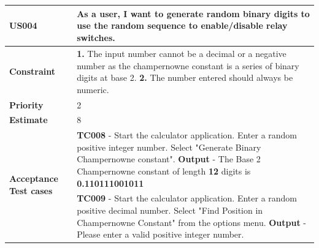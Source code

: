 \documentclass[12pt, a4paper]{report}
\begin{document}
\\\\\\\\
\begin{tabular}{|p{3cm}|p{12cm}|}
\hline
     \textbf{US004} &  As a user, I want to generate random binary digits to use the random sequence to enable/disable relay switches.\\\hline
     \textbf{Constraint} &  \textbf{1. } The input number cannot be a decimal or a negative number as the champernowne constant is a series of binary digits at base 2. \newline \textbf{2. } The number entered should always be numeric.\\\hline
     \textbf{Priority} & 2 \\\hline
     \textbf{Estimate} & 8 \\\hline
     \multirow{2}{3cm}{\textbf{Acceptance Test cases}} & \textbf{TC008} - Start the calculator application. Enter a random positive integer number. Select "Generate Binary Champernowne constant". \newline \textbf{Output} - The Base 2 Champernowne constant of length \textbf{12} digits is \textbf{0.110111001011}\\\cline{2-2}
     & \textbf{TC009} - Start the calculator application. Enter a random positive decimal number. Select "Find Position in Champernowne Constant" from the options menu. \newline \textbf{Output} - Please enter a valid positive integer number.\\\hline
\end{tabular}
\\\\\\\\
\end{document}
